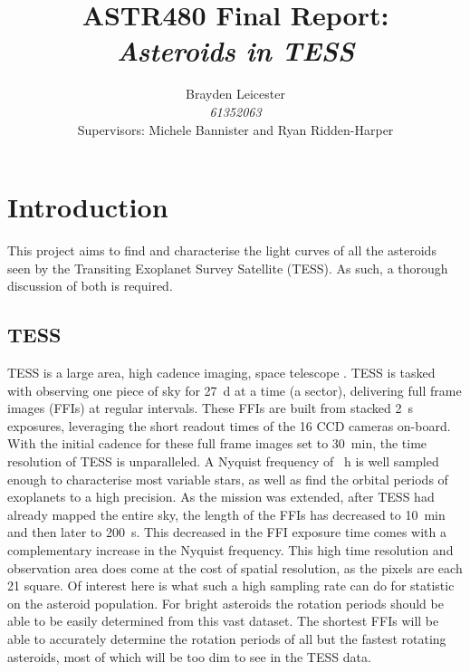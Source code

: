 \documentclass[12pt]{article}
\title{ASTR480 Final Report:\\
\textit{Asteroids in TESS}
}
\author{Brayden Leicester \\ 
\textit{61352063} \\
[1ex]\small{Supervisors: Michele Bannister and Ryan Ridden-Harper}
}
\begin{document}
\maketitle






\section{Introduction}\label{Sec:Intro}

This project aims to find and characterise the light curves of all the asteroids seen by the Transiting Exoplanet Survey Satellite (TESS). 
As such, a thorough discussion of both is required.


\subsection{TESS}\label{SubSec:TESS}
 
TESS is a large area, high cadence imaging, space telescope  \citep{Ricker2014}. 
TESS is tasked with observing one piece of sky for \qty{27}{\day} at a time (a sector), delivering  full frame images (FFIs) at regular intervals. 
These FFIs are built from stacked \qty{2}{\second} exposures, leveraging the short readout times of the 16 CCD cameras on-board. 
With the initial cadence for these full frame images set to \qty{30}{\minute}, the time resolution of TESS is unparalleled.
A Nyquist frequency %
of \unit{\per\hour} is well sampled enough to characterise most variable stars, as well as find the orbital periods of exoplanets to a high precision. 
As the mission was extended, after TESS had already mapped the entire sky, the length of the FFIs has decreased to \qty{10}{\minute} and then later to \qty{200}{\second}. 
This decreased in the FFI exposure time comes with a complementary increase in the Nyquist frequency. 
This high time resolution and observation area does come at the cost of spatial resolution, as the pixels are each \qty{21}{\arcsec} square.
Of interest here is what such a high sampling rate can do for statistic on the asteroid population. 
For bright asteroids the rotation periods should be able to be easily determined from this vast dataset. 
The shortest FFIs will be able to accurately determine the rotation periods of all but the fastest rotating asteroids, most of which will be too dim to see in the TESS data. 
\end{document}
